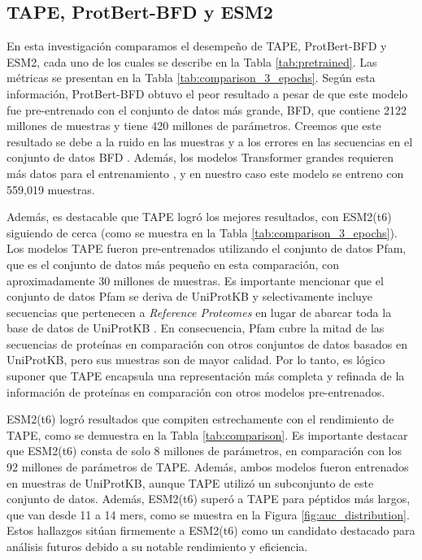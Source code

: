 \subsection{TAPE, ProtBert-BFD y ESM2}

En esta investigación comparamos el desempeño de TAPE, ProtBert-BFD y ESM2, cada uno de los cuales se describe en la Tabla \ref{tab:pretrained}. Las métricas se presentan en la Tabla \ref{tab:comparison_3_epochs}. Según esta información, ProtBert-BFD obtuvo el peor resultado a pesar de que este modelo fue pre-entrenado con el conjunto de datos más grande, BFD, que contiene 2122 millones de muestras y tiene 420 millones de parámetros. Creemos que este resultado se debe a la ruido en las muestras y a los errores en las secuencias en el conjunto de datos BFD \citep{elnaggar2021prottrans}. Además, los modelos Transformer grandes requieren más datos para el entrenamiento \citep{elnaggar2021prottrans}, y en nuestro caso este modelo se entreno con 559,019 muestras.


Además, es destacable que TAPE logró los mejores resultados, con ESM2(t6) siguiendo de cerca (como se muestra en la Tabla \ref{tab:comparison_3_epochs}). Los modelos TAPE fueron pre-entrenados utilizando el conjunto de datos Pfam, que es el conjunto de datos más pequeño en esta comparación, con aproximadamente 30 millones de muestras. Es importante mencionar que el conjunto de datos Pfam se deriva de UniProtKB y selectivamente incluye secuencias que pertenecen a \textit{Reference Proteomes} en lugar de abarcar toda la base de datos de UniProtKB \cite{finn2016pfam}. En consecuencia, Pfam cubre la mitad de las secuencias de proteínas en comparación con otros conjuntos de datos basados en UniProtKB, pero sus muestras son de mayor calidad. Por lo tanto, es lógico suponer que TAPE encapsula una representación más completa y refinada de la información de proteínas en comparación con otros modelos pre-entrenados.


ESM2(t6) logró resultados que compiten estrechamente con el rendimiento de TAPE, como se demuestra en la Tabla \ref{tab:comparison}. Es importante destacar que ESM2(t6) consta de solo 8 millones de parámetros, en comparación con los 92 millones de parámetros de TAPE. Además, ambos modelos fueron entrenados en muestras de UniProtKB, aunque TAPE utilizó un subconjunto de este conjunto de datos. Además, ESM2(t6) superó a TAPE para péptidos más largos, que van desde 11 a 14 mers, como se muestra en la Figura \ref{fig:auc_distribution}. Estos hallazgos sitúan firmemente a ESM2(t6) como un candidato destacado para análisis futuros debido a su notable rendimiento y eficiencia.
